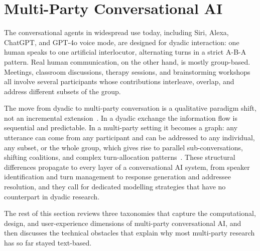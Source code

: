 
\section{Multi-Party Conversational AI}
\label{sec:multiparty-ca}

The conversational agents in widespread use today, including Siri, Alexa, ChatGPT, and GPT-4o voice mode, are designed for dyadic interaction: one human speaks to one artificial interlocutor, alternating turns in a strict A-B-A pattern. Real human communication, on the other hand, is mostly group-based. Meetings, classroom discussions, therapy sessions, and brainstorming workshops all involve several participants whose contributions interleave, overlap, and address different subsets of the group.

The move from dyadic to multi-party conversation is a qualitative paradigm shift, not an incremental extension~\cite{gu2022mpc,zheng2022polyadic,traum2004issues}. In a dyadic exchange the information flow is sequential and predictable. In a multi-party setting it becomes a graph: any utterance can come from any participant and can be addressed to any individual, any subset, or the whole group, which gives rise to parallel sub-conversations, shifting coalitions, and complex turn-allocation patterns~\cite{gu2022mpc}. These structural differences propagate to every layer of a conversational AI system, from speaker identification and turn management to response generation and addressee resolution, and they call for dedicated modelling strategies that have no counterpart in dyadic research.

The rest of this section reviews three taxonomies that capture the computational, design, and user-experience dimensions of multi-party conversational AI, and then discusses the technical obstacles that explain why most multi-party research has so far stayed text-based.

